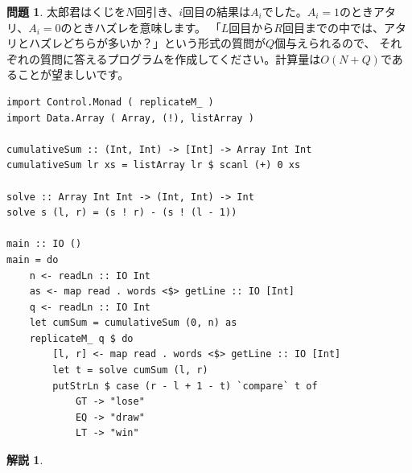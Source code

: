 \documentclass[12pt,a4paper,dvipdfmx,fleqn]{article}%
\theoremstyle{definition}
\newtheorem*{toi*}{問題}
\theoremstyle{definition}
\newtheorem*{ans*}{解説}
\theoremstyle{definition}
\begin{document}
\begin{toi*}
    太郎君はくじを$N$回引き、$i$回目の結果は$A_i$でした。$A_i=1$のときアタリ、$A_i=0$のときハズレを意味します。
    「$L$回目から$R$回目までの中では、アタリとハズレどちらが多いか？」という形式の質問が$Q$個与えられるので、
    それぞれの質問に答えるプログラムを作成してください。計算量は$O(N+Q)$であることが望ましいです。
\end{toi*}
\begin{lstlisting}[caption=B06.hs,label=B06]
import Control.Monad ( replicateM_ )
import Data.Array ( Array, (!), listArray )

cumulativeSum :: (Int, Int) -> [Int] -> Array Int Int
cumulativeSum lr xs = listArray lr $ scanl (+) 0 xs

solve :: Array Int Int -> (Int, Int) -> Int
solve s (l, r) = (s ! r) - (s ! (l - 1))

main :: IO ()
main = do
    n <- readLn :: IO Int
    as <- map read . words <$> getLine :: IO [Int]
    q <- readLn :: IO Int
    let cumSum = cumulativeSum (0, n) as
    replicateM_ q $ do 
        [l, r] <- map read . words <$> getLine :: IO [Int]
        let t = solve cumSum (l, r)
        putStrLn $ case (r - l + 1 - t) `compare` t of
            GT -> "lose"
            EQ -> "draw"
            LT -> "win"
\end{lstlisting}
\begin{ans*}
\end{ans*}
\end{document}
